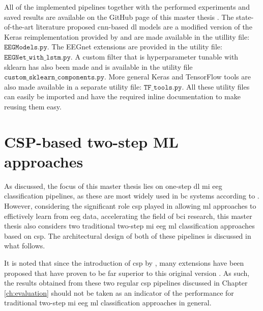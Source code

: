All of the implemented pipelines together with the performed experiments and saved results are available on the GitHub page of this master thesis \citep{github_project}.
The state-of-the-art literature proposed \gls{cnn}-based \gls{dl} models are a modified version of the Keras reimplementation provided by \citet{arl_eegmodels} and are made available in the utillity file: $\texttt{EEGModels.py}$.
The EEGnet extensions are provided in the utility file: $\texttt{EEGNet\_with\_lstm.py}$.
A custom filter that is hyperparameter tunable with \gls{sklearn} has also been made and is available in the utility file $\texttt{custom\_sklearn\_components.py}$.
More general Keras and TensorFlow tools are also made available in a separate utility file: $\texttt{TF\_tools.py}$.
All these utility files can easily be imported and have the required inline documentation to make reusing them easy.

\section{CSP-based two-step ML approaches}
\label{sec:offline_bci_system_two_step_ml}

As discussed, the focus of this master thesis lies on one-step \gls{dl} \gls{mi} \gls{eeg} classification pipelines, as these are most widely used in \gls{bc} systems according to \citet{bci_review_arnau}.
However, considering the significant role \gls{csp} played in allowing \gls{ml} approaches to effictively learn from \gls{eeg} data, accelerating the field of \gls{bci} research, this master thesis also considers two traditional two-step \gls{mi} \gls{eeg} \gls{ml} classification approaches based on \gls{csp}.
The architectural design of both of these pipelines is discussed in what follows.

It is noted that since the introduction of \gls{csp} by \citet{first_csp}, many extensions have been proposed that have proven to be far superior to this original version \citep{eeg_model_fbcsp, bci_book_csp_extension}.
As such, the results obtained from these two regular \gls{csp} pipelines discussed in Chapter \ref{ch:evaluation} should not be taken as an indicator of the performance for traditional two-step \gls{mi} \gls{eeg} \gls{ml} classification approaches in general.


